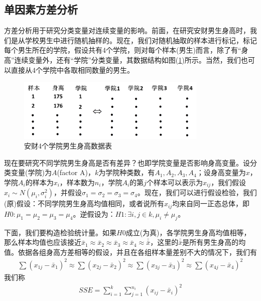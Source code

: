     \subsection{单因素方差分析}
        \par
        方差分析用于研究分类变量对连续变量的影响。前面，在研究安财男生身高时，我们是从学校男生中进行随机抽样的。现在，我们对随机抽取的样本进行标记，标记每个男生所在的学院，假设共有4个学院，则对每个样本(男生)而言，除了有“身高”连续变量外，还有“学院”分类变量，其数据结构如图(\ref{fig:安财4个学院男生身高数据表})所示。当然，我们也可以直接从4个学院中各取相同数量的男生。
            \begin{figure}[H]
            \centering
            \includegraphics[height=3cm]{images/boys_height_data_sheet.jpg}
            \caption{安财4个学院男生身高数据表}
            \label{fig:安财4个学院男生身高数据表}
            \end{figure}
        \par
        现在要研究不同学院男生身高是否有差异？也即学院变量是否影响身高变量。设分类变量(学院)为$A$(factor A)，$k$为学院种类数，有$A_1,A_2,A_3,A_4$；设身高变量为$x$，学院$A_i$的样本为$x_i$，样本数为$n_i$，学院$A_i$的第$j$个样本可以表示为$x_{ij}$，我们假设$x_i\sim N(\mu_i,\sigma_i^2)$，并假设$\sigma_1 = \sigma_2 = \sigma_3 = \sigma_4$。现在，我们可以进行假设检验，我们(原)假设：不同学院男生身高均值相同，或者说所有$x_{ij}$均来自同一正态总体，即$H0:\mu_1=  \mu_2=\mu_3=\mu_4$。逆假设为：$H1:\exists i,j\in k,\mu_i \neq \mu_j$。
        \par
        下面，我们要构造检验统计量。如果$H0$成立(为真)，各学院男生身高均值相等，那么样本均值也应该接近$\bar{x}_1 \approx \bar{x}_2\approx\bar{x}_3 \approx \bar{x}_4 \approx \bar{\bar{x}}$，这里的$\bar{\bar{x}}$是所有男生身高的均值。依据各组身高方差相等的假设，并且在各组样本量差别不大的情况下，我们有
        \begin{align*}
        \sum(x_{1j} - \bar{x}_1)^2 \approx \sum(x_{2j} - \bar{x}_2)^2  \approx \sum(x_{3j} - \bar{x}_3)^2  \approx \sum(x_{4j} - \bar{x}_4)^2
        \end{align*}
        我们称
        \begin{align*}
        SSE = \sum_{i=1}^k \sum_{j=1}^{n_i} (x_{ij}-\bar{x}_i)^2
        \end{align*}

